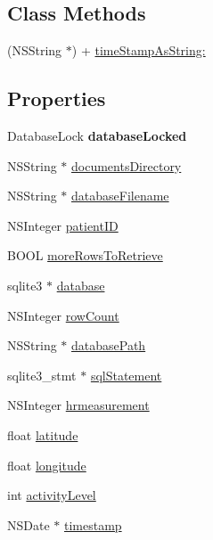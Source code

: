 \subsection*{Class Methods}
\begin{DoxyCompactItemize}
\item 
(N\-S\-String $\ast$) + \hyperlink{interface_d_b_manager_a7c8d65202b11dbd5c926bc6a01c4259d}{time\-Stamp\-As\-String\-:}
\end{DoxyCompactItemize}
\subsection*{Properties}
\begin{DoxyCompactItemize}
\item 
\hypertarget{interface_d_b_manager_a53c82a62e108227a256521c0587df6ad}{Database\-Lock {\bfseries database\-Locked}}\label{interface_d_b_manager_a53c82a62e108227a256521c0587df6ad}

\item 
N\-S\-String $\ast$ \hyperlink{interface_d_b_manager_a2da5077535faad528421bada70121866}{documents\-Directory}
\item 
N\-S\-String $\ast$ \hyperlink{interface_d_b_manager_a725c101d5daf6506b59e0f7e06993982}{database\-Filename}
\item 
N\-S\-Integer \hyperlink{interface_d_b_manager_a7206acae059164df418a2dbfaa7fbb13}{patient\-I\-D}
\item 
B\-O\-O\-L \hyperlink{interface_d_b_manager_a921cb5034e1b4f79c6db59a1ce3fd579}{more\-Rows\-To\-Retrieve}
\item 
sqlite3 $\ast$ \hyperlink{interface_d_b_manager_aa3315763d817eb3c10dac39ee530e2a8}{database}
\item 
N\-S\-Integer \hyperlink{interface_d_b_manager_a7299e28bee3f75281496adcebb46010b}{row\-Count}
\item 
N\-S\-String $\ast$ \hyperlink{interface_d_b_manager_a15a4e85cdc292d83ee3d8b28e43c43bc}{database\-Path}
\item 
sqlite3\-\_\-stmt $\ast$ \hyperlink{interface_d_b_manager_ae714f21433f7593c722b727d2ae9c66a}{sql\-Statement}
\item 
N\-S\-Integer \hyperlink{interface_d_b_manager_ac89481f8c2c45def2b8edb2ba749df68}{hrmeasurement}
\item 
float \hyperlink{interface_d_b_manager_a12dcee066d2cecde8507a6529df92521}{latitude}
\item 
float \hyperlink{interface_d_b_manager_aa881cd8f0940350240e3ae9a326e5563}{longitude}
\item 
int \hyperlink{interface_d_b_manager_aff07ccf2439a2df78a5375303d5272a7}{activity\-Level}
\item 
N\-S\-Date $\ast$ \hyperlink{interface_d_b_manager_a62443c98d9fade6ab9906836bf146b72}{timestamp}
\end{DoxyCompactItemize}


